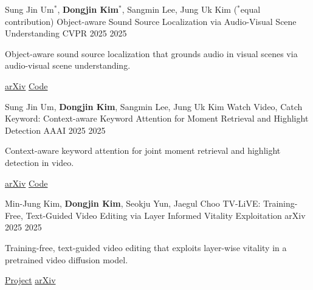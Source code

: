 
\begin{cventries}

  \cventry
    {Sung Jin Um$^*$, \textbf{Dongjin Kim}$^*$, Sangmin Lee, Jung Uk Kim \quad ($^*$equal contribution)}
    {Object-aware Sound Source Localization via Audio-Visual Scene Understanding}
    {CVPR 2025}
    {2025}
    {%
      \begin{cvitems}
        \item Object-aware sound source localization that grounds audio in visual scenes via audio-visual scene understanding.
        \item \href{https://arxiv.org/pdf/2506.18557}{arXiv} \quad
              \href{https://github.com/VisualAIKHU/OA-SSL}{Code}
      \end{cvitems}
    }

  \cventry
    {Sung Jin Um, \textbf{Dongjin Kim}, Sangmin Lee, Jung Uk Kim}
    {Watch Video, Catch Keyword: Context-aware Keyword Attention for Moment Retrieval and Highlight Detection}
    {AAAI 2025}
    {2025}
    {%
      \begin{cvitems}
        \item Context-aware keyword attention for joint moment retrieval and highlight detection in video.
        \item \href{https://arxiv.org/pdf/2501.02504}{arXiv} \quad
              \href{https://github.com/VisualAIKHU/Keyword-DETR}{Code}
      \end{cvitems}
    }

  \cventry
    {Min-Jung Kim, \textbf{Dongjin Kim}, Seokju Yun, Jaegul Choo}
    {TV-LiVE: Training-Free, Text-Guided Video Editing via Layer Informed Vitality Exploitation}
    {arXiv 2025}
    {2025}
    {%
      \begin{cvitems}
        \item Training-free, text-guided video editing that exploits layer-wise vitality in a pretrained video diffusion model.
        \item \href{https://emjay73.github.io/TV_LiVE/}{Project} \quad
              \href{https://arxiv.org/abs/2506.07205}{arXiv}
      \end{cvitems}
    }

\end{cventries}


